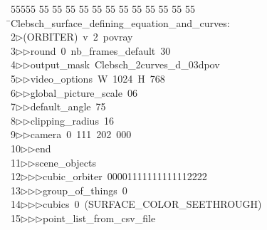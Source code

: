 %
%
\begin{tabbing}
55555 \= 55 \= 55 \= 55 \= 55 \= 55 \= 55 \= 55 \= 55 \= 55 \= 55 \= 55 \= 55 \= \>Clebsch\_surface\_defining\_equation\_and\_curves:\\[0pt]
2\>$\triangleright$\>(ORBITER)\ v\ 2\ povray\ \\[0pt]
3\>$\triangleright$\>$\triangleright$\>round\ 0\ nb\_frames\_default\ 30\ \\[0pt]
4\>$\triangleright$\>$\triangleright$\>output\_mask\ Clebsch\_2curves\_d\_03dpov\ \\[0pt]
5\>$\triangleright$\>$\triangleright$\>video\_options\ W\ 1024\ H\ 768\ \\[0pt]
6\>$\triangleright$\>$\triangleright$\>global\_picture\_scale\ 06\ \\[0pt]
7\>$\triangleright$\>$\triangleright$\>default\_angle\ 75\ \\[0pt]
8\>$\triangleright$\>$\triangleright$\>clipping\_radius\ 16\ \\[0pt]
9\>$\triangleright$\>$\triangleright$\>camera\ 0\ 111\ 202\ 000\ \\[0pt]
10\>$\triangleright$\>$\triangleright$\>end\ \\[0pt]
11\>$\triangleright$\>$\triangleright$\>scene\_objects\ \\[0pt]
12\>$\triangleright$\>$\triangleright$\>$\triangleright$\>cubic\_orbiter\ 00001111111111112222\ \\[0pt]
13\>$\triangleright$\>$\triangleright$\>$\triangleright$\>group\_of\_things\ 0\ \\[0pt]
14\>$\triangleright$\>$\triangleright$\>$\triangleright$\>cubics\ 0\ (SURFACE\_COLOR\_SEETHROUGH)\ \\[0pt]
15\>$\triangleright$\>$\triangleright$\>$\triangleright$\>point\_list\_from\_csv\_file\ \\[0pt]

\end{tabbing}

